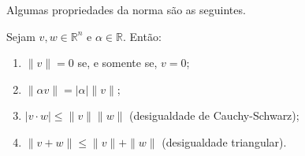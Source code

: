 Algumas propriedades da norma são as seguintes.
\begin{proposition}
    Sejam $v, w \in \mathbb R^n$ e $\alpha \in \mathbb R$. Então:
    \begin{enumerate}[label=(\roman*)]
        \item $\|v\| = 0$ se, e somente se, $v=0$;
        \item $\|\alpha v\| = |\alpha| \|v\|$;
        \item $|v\cdot w| \leq \|v\| \|w\|$ (desigualdade de Cauchy-Schwarz);
        \item $\|v+w\| \leq \|v\| + \|w\|$ (desigualdade triangular).
    \end{enumerate}
\end{proposition}

